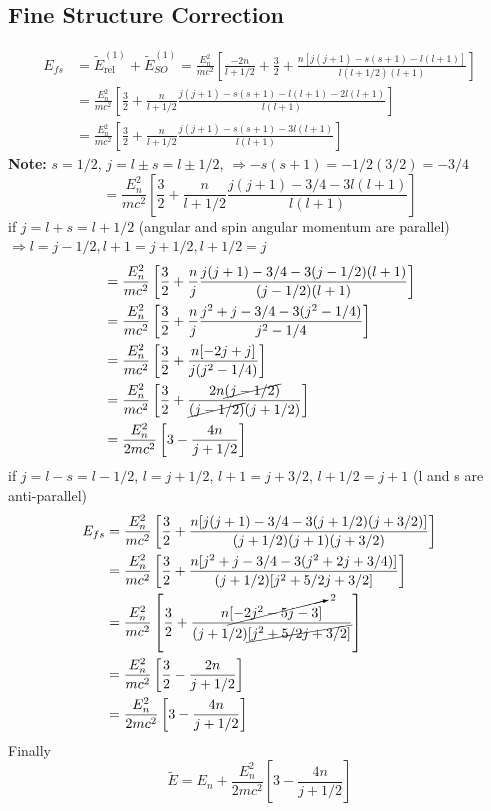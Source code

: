 \documentclass[12pt,fancychapters]{report}
\numberwithin{equation}{section}
\begin{document}
\subsection{Fine Structure Correction}
\begin{align*}
  E_{fs} &= \tilde{E}^{(1)}_\text{rel} + \tilde{E}_{SO}^{(1)} = \frac{E_n^2}{mc^2}
  \left[\frac{-2n}{l+1/2} + \frac{3}{2} + \frac{ n[j(j+1) - s(s+1)- l(l+1) ] }
  {l(l+1/2)(l+1)} \right]\\
         &= \frac{E_n^2}{mc^2}\left[\frac{3}{2}+\frac{n}{l+1/2} \frac{ 
j(j+1) - s(s+1)- l(l+1) - 2l(l+1)
         }{l(l+1)} \right]\\
&= \frac{E_n^2}{mc^2}\left[ \frac{3}{2} + \frac{n}{l+1/2} 
\frac{ j(j+1) - s(s+1) - 3l(l+1)}{l(l+1)}\right]
\end{align*}
\textbf{Note:} $s =1/2$, $j = l \pm s = l \pm 1/2$, $\Rightarrow -s(s+1)=-1/2(3/2) = -3/4$ 
\[
  =\frac{E_n^2}{mc^2}\left[ \frac{3}{2} + \frac{n}{l+1/2} 
\frac{ j(j+1) - 3/4 - 3l(l+1)}{l(l+1)}\right] 
\]
if $j= l+s = l + 1/2$ (angular and spin angular momentum are parallel) $\Rightarrow 
l = j - 1/2, l+1= j+1/2, l+1/2= j$
\begin{align*}
  &=\frac{E_n^2}{mc^2}\left[ \frac{3}{2} + \frac{n}{j} 
\frac{ j(j+1) - 3/4 - 3(j-1/2)(l+1)}{(j-1/2)(l+1)}\right]  \\
  &=\frac{E_n^2}{mc^2}\left[ \frac{3}{2} + \frac{n}{j} 
\frac{ j^2+j - 3/4 - 3(j^2-1/4)}{j^2-1/4}\right]\\
  &= \frac{E_n^2}{mc^2}\left[\frac{3}{2}+ \frac{n[-2j+j]}{j(j^2-1/4)} \right]\\
  &= \frac{E_n^2}{mc^2}\left[\frac{3}{2}+\frac{2n\cancel{(j-1/2)}}
  {\cancel{(j-1/2)}(j+1/2)}\right]\\
  &= \frac{E_n^2}{2mc^2}\left[3-\frac{4n}{j+1/2}\right]
\end{align*}
if $j=l-s = l-1/2$, $l = j+1/2$, $l+1=j+3/2$, $l+1/2=j+1$ (l and s are anti-parallel)
\begin{align*}
  E_{fs} &= \frac{E_n^2}{mc^2}\left[\frac{3}{2} + \frac{n[j(j+1)-3/4 - 3(j+1/2)(j+3/2)]}
  {(j+1/2)(j+1)(j+3/2)}\right]\\
&= \frac{E_n^2}{mc^2}\left[\frac{3}{2}+\frac{n[j^2+j-3/4-3(j^2+2j+3/4)]}
   {(j+1/2)[j^2 +5/2 j +3/2]} \right]\\
&= \frac{E_n^2}{mc^2}\left[\frac{3}{2}+\frac{n\cancelto{2}{[-2j^2-5j-3]}}{(j+1/2)
\cancel{[j^2+5/2j+3/2]}} \right]\\
&= \frac{E_n^2}{mc^2}\left[\frac{3}{2}-\frac{2n}{j+1/2}\right]\\
&= \frac{E_n^2}{2mc^2}\left[3-\frac{4n}{j+1/2}\right]
\end{align*}
Finally
\begin{equation}
  \tilde{E} = E_n + \frac{E_n^2}{2mc^2}\left[3 - \frac{4n}{j+1/2}\right]
\end{equation}
\newpage
\end{document}
